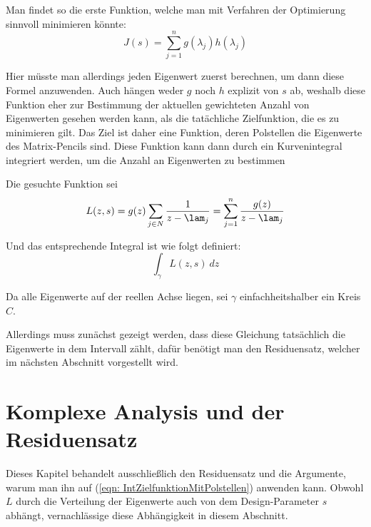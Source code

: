 \documentclass[a4paper,12pt]{report}
\newcommand{\1}{\mathds{1}}
\theoremstyle{plain} %
\theoremstyle{definition} %
\theoremstyle{remark}
\begin{document}
            Man findet so die erste Funktion, welche man mit Verfahren der Optimierung sinnvoll minimieren könnte:
            \begin{equation}
                  \label{def: J original}
                  J(s) = \sum_{j=1}^n g(\lambda_j)h(\lambda_j)
            \end{equation}

            Hier müsste man allerdings jeden Eigenwert zuerst berechnen, um dann diese Formel anzuwenden.
            Auch hängen weder $g$ noch $h$ explizit von $s$ ab, weshalb diese Funktion eher zur Bestimmung der aktuellen gewichteten Anzahl von Eigenwerten gesehen werden kann, als die tatächliche Zielfunktion, die es zu minimieren gilt.
            Das Ziel ist daher eine Funktion, deren Polstellen die Eigenwerte des Matrix-Pencils sind.
            Diese Funktion kann dann durch ein Kurvenintegral integriert werden, um die Anzahl an Eigenwerten zu bestimmen

            Die gesuchte Funktion sei
            \begin{equation}
                  \label{eqn: ZielfunktionMitPolstellen}
                  L(z, s) = g(z)\sum_{j\in N} \frac{1}{z-\lam_j} = \sum_{j=1}^n \frac{g(z)}{z-\lam_j}
            \end{equation}

            Und das entsprechende Integral ist wie folgt definiert:
            \begin{equation}
                  \label{eqn: IntZielfunktionMitPolstellen}
                 \int_\gamma L(z, s)\ dz
            \end{equation}

            Da alle Eigenwerte auf der reellen Achse liegen, sei $\gamma$ einfachheitshalber ein Kreis $C$.

            Allerdings muss zunächst gezeigt werden, dass diese Gleichung tatsächlich die Eigenwerte in dem Intervall zählt, dafür benötigt man den Residuensatz, welcher im nächsten Abschnitt vorgestellt wird.

      \section{Komplexe Analysis und der Residuensatz}
            Dieses Kapitel behandelt ausschließlich den Residuensatz und die Argumente, warum man ihn auf (\ref{eqn: IntZielfunktionMitPolstellen}) anwenden kann.
            Obwohl $L$ durch die Verteilung der Eigenwerte auch von dem Design-Parameter $s$ abhängt, vernachlässige diese Abhängigkeit in diesem Abschnitt.
\end{document}
